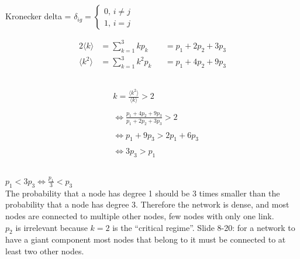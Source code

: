 \documentclass[../document.tex]{subfiles}
\begin{document}
\section{}
\subsection{}
Kronecker delta = $ \delta_{ig} =
\begin{cases}
  0, \, i \neq j \\    
  1, \, i =  j    
\end{cases} $

\begin{alignat*}{2}
\langle k \rangle    &=  \sum\limits^3_{k=1} k p_k    &&=  p_1 + 2 p_2 + 3 p_3 \\
\langle k^2 \rangle  &=  \sum\limits^3_{k=1} k^2 p_k  &&=  p_1 + 4 p_2 + 9 p_3
\end{alignat*}

\subsection{}
\begin{align*}
&k = \frac{ \langle k^2 \rangle }{ \langle k \rangle } > 2      \\ \\
&\iff \frac{ p_1 + 4 p_2 + 9 p_3 }{ p_1 + 2 p_2 + 3 p_3 } > 2   \\ \\
&\iff p_1 + 9 p_3 > 2 p_1 + 6 p_3                               \\ \\
&\iff 3 p_3 > p_1
\end{align*}

\subsection{}
$ p_1 < 3p_3 \iff \frac{p_1}{3} < p_3 $ \\

The probability that a node has degree 1 should be 3 times smaller than the probability that a node has degree 3. Therefore the network is dense, and most nodes are connected to multiple other nodes, few nodes with only one link. \\

$ p_2 $ is irrelevant because $ k = 2 $ is the ``critical regime''. Slide 8-20: for a network to have a giant component most nodes that belong to it must be connected to at least two other nodes.
\end{document}
